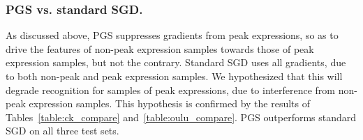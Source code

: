 \documentclass[runningheads]{llncs}
\begin{document}
\subsubsection{PGS vs. standard SGD.} As discussed above, PGS suppresses gradients
from peak expressions, so as to drive the features of non-peak 
expression samples towards those of peak expression samples, but not the
contrary. Standard SGD uses all gradients, due to both non-peak and peak 
expression samples. We hypothesized that this will degrade recognition 
for samples of peak expressions, due to interference from non-peak 
expression samples. This hypothesis is confirmed by the results
of Tables~\ref{table:ck_compare} and~\ref{table:oulu_compare}. 
PGS outperforms standard SGD on all three test sets.
%
\end{document}
